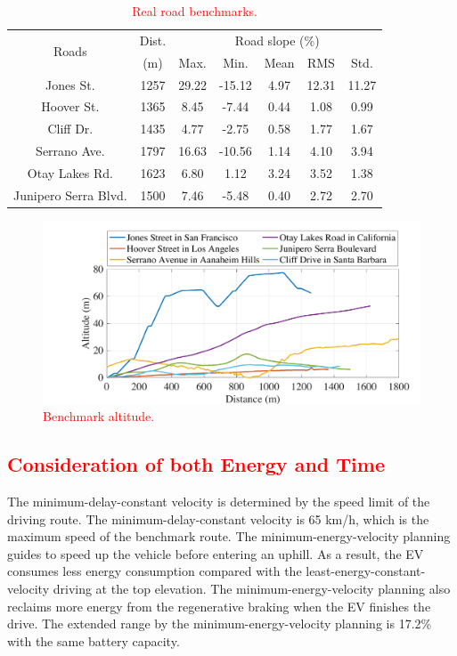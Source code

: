 \documentclass{IEEEtran}
\begin{document}
\begin{table} 
\caption{\textcolor{red}{Real road benchmarks.}}
\centering
\label{table:road_bench}
\begin{tabular}{|c|c|c|c|c|c|c|}  \hline
\multirow{2}{*}{Roads} 
				&Dist.		&\multicolumn{5}{|c|}{Road slope (\%)}  \\ \cline{3-7}
				&(m)		 	&Max.		&Min. 	&Mean		&RMS 	&Std.	\\ \hline
Jones St. 	&1257		&29.22		&-15.12	&4.97 		&12.31 	&11.27	\\ \hline
Hoover St. 	&1365		&8.45		&-7.44	&0.44		&1.08 	&0.99	\\ \hline
Cliff Dr. 	&1435		&4.77		&-2.75	&0.58		&1.77 	&1.67	\\ \hline
Serrano Ave.		&1797		&16.63		&-10.56	&1.14 		&4.10 	&3.94	\\ \hline
Otay Lakes Rd.		&1623		&6.80		&1.12	&3.24		&3.52 	&1.38	\\ \hline
Junipero Serra Blvd.	&1500		&7.46		&-5.48	&0.40		&2.72 	&2.70	\\ \hline
\end{tabular}
\end{table}


\begin{figure}	 %
\includegraphics[width=1.0\hsize]{Figures/Benchmark_altitude.pdf}
\caption{\textcolor{red}{Benchmark altitude.}}
\label{fig:bench_altitude}
\end{figure} 


\textcolor{red}{\subsection{Consideration of both Energy and Time}} \label{subsec:energy_time}


The minimum-delay-constant velocity is determined by the speed limit of the driving route. The minimum-delay-constant velocity is 65 km/h, which is the maximum speed of the benchmark route.
The minimum-energy-velocity planning guides to speed up the vehicle before entering an uphill. As a result, the EV consumes less energy consumption compared with the least-energy-constant-velocity driving at the top elevation. The minimum-energy-velocity planning also reclaims more energy from the regenerative braking when the EV finishes the drive. The extended range by the minimum-energy-velocity planning is 17.2\% with the same battery capacity.
\end{document}

